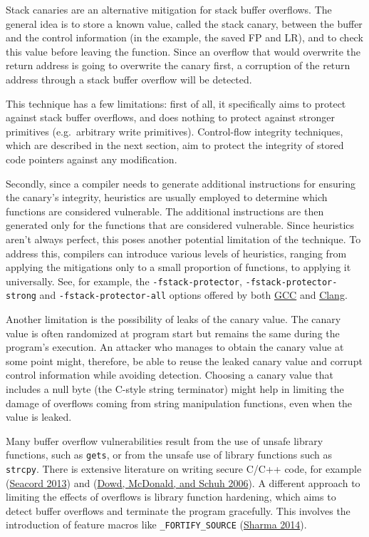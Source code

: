 \documentclass[
  a4paper,
]{report}
\begin{document}
Stack canaries are an alternative mitigation for stack buffer overflows.
The general idea is to store a known value, called the stack canary,
between the buffer and the control information (in the example, the
saved FP and LR), and to check this value before leaving the function.
Since an overflow that would overwrite the return address is going to
overwrite the canary first, a corruption of the return address through a
stack buffer overflow will be detected.

This technique has a few limitations: first of all, it specifically aims
to protect against stack buffer overflows, and does nothing to protect
against stronger primitives (e.g.~arbitrary write primitives).
Control-flow integrity techniques, which are described in the next
section, aim to protect the integrity of stored code pointers against
any modification.

Secondly, since a compiler needs to generate additional instructions for
ensuring the canary's integrity, heuristics are usually employed to
determine which functions are considered vulnerable. The additional
instructions are then generated only for the functions that are
considered vulnerable. Since heuristics aren't always perfect, this
poses another potential limitation of the technique. To address this,
compilers can introduce various levels of heuristics, ranging from
applying the mitigations only to a small proportion of functions, to
applying it universally. See, for example, the
\texttt{-fstack-protector}, \texttt{-fstack-protector-strong} and
\texttt{-fstack-protector-all} options offered by both
\href{https://gcc.gnu.org/onlinedocs/gcc/Instrumentation-Options.html}{GCC}
and
\href{https://clang.llvm.org/docs/ClangCommandLineReference.html\#cmdoption-clang-fstack-protector}{Clang}.

Another limitation is the possibility of leaks of the canary value. The
canary value is often randomized at program start but remains the same
during the program's execution. An attacker who manages to obtain the
canary value at some point might, therefore, be able to reuse the leaked
canary value and corrupt control information while avoiding detection.
Choosing a canary value that includes a null byte (the C-style string
terminator) might help in limiting the damage of overflows coming from
string manipulation functions, even when the value is leaked.

Many buffer overflow vulnerabilities result from the use of unsafe
library functions, such as \texttt{gets}, or from the unsafe use of
library functions such as \texttt{strcpy}. There is extensive literature
on writing secure C/C++ code, for example
(\protect\hyperlink{ref-Seacord2013}{Seacord 2013}) and
(\protect\hyperlink{ref-Dowd2006}{Dowd, McDonald, and Schuh 2006}). A
different approach to limiting the effects of overflows is library
function hardening, which aims to detect buffer overflows and terminate
the program gracefully. This involves the introduction of feature macros
like \texttt{\_FORTIFY\_SOURCE}
(\protect\hyperlink{ref-Sharma2014}{Sharma 2014}).
\end{document}
